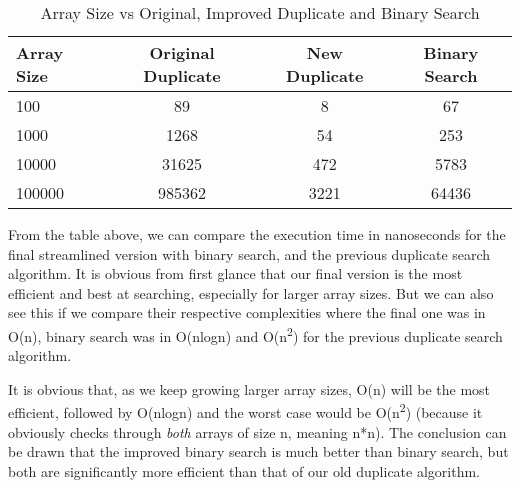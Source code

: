 \documentclass[a4paper,11pt]{article}
\begin{document}
\begin{table}[h]
\begin{center}
\begin{tabular}{l|c|c|c}
\textbf{Array Size} & \textbf{Original Duplicate} & \textbf{New Duplicate} & \textbf{Binary Search}\\
\hline
  100      & 89   & 8 & 67\\
  1000     & 1268   & 54 & 253\\
  10000    &  31625  & 472 & 5783\\
  100000   &  985362  & 3221 & 64436\\
\end{tabular}
\caption{Array Size vs Original, Improved Duplicate and Binary Search}
\label{tab:table4}
\end{center}
\end{table}

From the table above, we can compare the execution time in nanoseconds for the final streamlined version with binary search, and the previous duplicate search algorithm. It is obvious from first glance that our final version is the most efficient and best at searching, especially for larger array sizes. But we can also see this if we compare their respective complexities where the final one was in O(n), binary search was in O(nlogn) and O(n\textsuperscript{2}) for the previous duplicate search algorithm. 

It is obvious that, as we keep growing larger array sizes, O(n) will be the most efficient, followed by O(nlogn) and the worst case would be O(n\textsuperscript{2}) (because it obviously checks through {\em both} arrays of size n, meaning n*n). The conclusion can be drawn that the improved binary search is much better than binary search, but both are significantly more efficient than that of our old duplicate algorithm.
\end{document}

